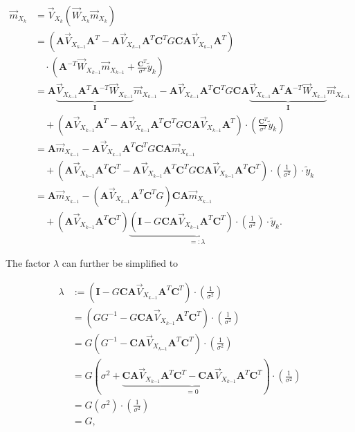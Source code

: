 \documentclass[11pt,a4paper,twoside]{report}
\newcommand{\messF}[3]{\overrightarrow{#1}_{{#2}_{k{#3}}}}
\newcommand{\mat}[1]{\mathbf{#1}}
\begin{document}
\begin{align}
	\label{eq: update rule, mean vector}
	\messF{m}{X}{} &= \messF{V}{X}{} \left( \messF{W}{X}{}\messF{m}{X}{} \right) \\
	&= \left(\mat{A}\messF{V}{X}{-1}\mat{A}^T - \mat{A}\messF{V}{X}{-1}\mat{A}^T \mat{C}^T G\mat{C}\mat{A}\messF{V}{X}{-1}\mat{A}^T\right) \\
	&\nonumber \quad \cdot \left( \mat{A}^{-T}\messF{W}{X}{-1}\messF{m}{X}{-1} + \frac{\mat{C}^T}{\sigma^2}\tilde{y}_k \right) \\
	&= \mat{A} \underbrace{\messF{V}{X}{-1}\mat{A}^T\mat{A}^{-T}\messF{W}{X}{-1}}_{\mat{I}} \messF{m}{X}{-1} - \mat{A}\messF{V}{X}{-1}\mat{A}^T \mat{C}^T G\mat{C}\mat{A}\underbrace{\messF{V}{X}{-1}\mat{A}^T\mat{A}^{-T}\messF{W}{X}{-1}}_{\mat{I}}\messF{m}{X}{-1} \\
	&\nonumber \quad + \left(\mat{A}\messF{V}{X}{-1}\mat{A}^T - \mat{A}\messF{V}{X}{-1}\mat{A}^T \mat{C}^T G\mat{C}\mat{A}\messF{V}{X}{-1}\mat{A}^T\right) \cdot \left( \frac{\mat{C}^T}{\sigma^2}\tilde{y}_k \right) \\
	&= \mat{A} \messF{m}{X}{-1} - \mat{A}\messF{V}{X}{-1}\mat{A}^T \mat{C}^T G\mat{C}\mat{A}\messF{m}{X}{-1} \\
	&\nonumber \quad + \left(\mat{A}\messF{V}{X}{-1}\mat{A}^T\mat{C}^T - \mat{A}\messF{V}{X}{-1}\mat{A}^T \mat{C}^T G\mat{C}\mat{A}\messF{V}{X}{-1}\mat{A}^T\mat{C}^T\right) \cdot \left(\frac{1}{\sigma^2}\right) \cdot \tilde{y}_k \\
	&= \mat{A} \messF{m}{X}{-1} - \left(\mat{A}\messF{V}{X}{-1}\mat{A}^T \mat{C}^T G\right)\mat{C}\mat{A}\messF{m}{X}{-1} \\
	&\nonumber \quad + \left(\mat{A}\messF{V}{X}{-1}\mat{A}^T\mat{C}^T\right) \underbrace{\left(\mat{I} - G\mat{C}\mat{A}\messF{V}{X}{-1}\mat{A}^T\mat{C}^T\right) \cdot \left(\frac{1}{\sigma^2}\right)}_{=:\lambda} \cdot \tilde{y}_k.
\end{align}

The factor $\lambda$ can further be simplified to

\begin{align}
	\label{eq: lambda factor}
	\lambda &:= \left(\mat{I} - G\mat{C}\mat{A}\messF{V}{X}{-1}\mat{A}^T\mat{C}^T\right) \cdot \left(\frac{1}{\sigma^2}\right) \\
	&= \left(GG^{-1} - G\mat{C}\mat{A}\messF{V}{X}{-1}\mat{A}^T\mat{C}^T\right) \cdot \left(\frac{1}{\sigma^2}\right) \\
	&= G\left(G^{-1} - \mat{C}\mat{A}\messF{V}{X}{-1}\mat{A}^T\mat{C}^T\right) \cdot \left(\frac{1}{\sigma^2}\right) \\
	&= G\left(\sigma^2 + \underbrace{\mat{C} \mat{A}\messF{V}{X}{-1} \mat{A}^T\mat{C}^T - \mat{C}\mat{A}\messF{V}{X}{-1}\mat{A}^T\mat{C}^T}_{=0}\right) \cdot \left(\frac{1}{\sigma^2}\right) \\
	&= G\left(\sigma^2 \right) \cdot \left(\frac{1}{\sigma^2}\right) \\
	&= G,
\end{align}
\end{document}
